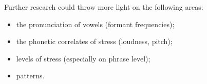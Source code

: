 \newpage 
Further research could throw more light on the following areas:

\begin{itemize}
\item 
the pronunciation of vowels (formant frequencies);

\item 
the phonetic correlates of stress (loudness, pitch);

\item 
levels of stress (especially on phrase level);

\item 
{} patterns.

\end{itemize}
